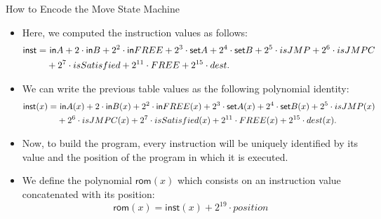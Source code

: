 \begin{frame}[allowframebreaks]{How to Encode the Move State Machine}
\normalsize
\begin{itemize}
\item Here, we computed the instruction values as follows:
\begin{align*}
\mathsf{inst} = &~\mathsf{in} A + 2 \cdot \mathsf{in} B + 2^2 \cdot \mathsf{in} FREE + 2^3 \cdot \mathsf{set} A + 2^4 \cdot \mathsf{set} B + 2^5 \cdot isJMP + 2^6 \cdot isJMPC \\ 
& + 2^7 \cdot isSatisfied + 2^{11} \cdot FREE + 2^{15} \cdot dest.
\end{align*}

\item We can write the previous table values as the following polynomial identity:
\begin{align*}
\mathsf{inst}(x) = &~\mathsf{in} A(x) + 2 \cdot \mathsf{in} B(x) + 2^2 \cdot \mathsf{in} FREE(x) + 2^3 \cdot \mathsf{set} A(x) + 2^4 \cdot \mathsf{set} B(x) + 2^5 \cdot isJMP(x) \\
& + 2^6 \cdot isJMPC(x) + 2^7 \cdot isSatisfied(x) + 2^{11} \cdot FREE(x) + 2^{15} \cdot dest(x).
\end{align*}

\item Now, to build the program, every instruction will be uniquely identified by its value and the position of the program in which it is executed.

\item We define the polynomial $\mathsf{rom}(x)$ which consists on an instruction value concatenated with its position:
\[
\mathsf{rom}(x) = \mathsf{inst}(x) + 2^{19} \cdot position
\]
\end{itemize}
\end{frame}










